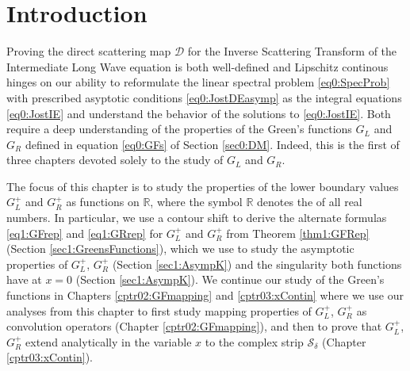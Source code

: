 \documentclass[../dissertation.tex]{subfiles}
\begin{document}
\setcounter{section}{-1}
\section{Introduction}\label{sec1:Intro}

Proving the direct scattering map $\mathscr D$ for the Inverse Scattering Transform
of the Intermediate Long Wave equation is both well-defined and Lipschitz 
continous hinges on our ability to reformulate the linear spectral problem 
\eqref{eq0:SpecProb} with prescribed asyptotic conditions \eqref{eq0:JostDEasymp}
as the integral equations \eqref{eq0:JostIE} and understand the behavior of 
the solutions to \eqref{eq0:JostIE}. Both require a deep understanding of
the properties of the Green's functions $G_L$ and $G_R$ defined in equation
\eqref{eq0:GFs} of Section \ref{sec0:DM}. Indeed, this is the first of three
chapters devoted solely to the study of $G_L$ and $G_R$.


The focus of this chapter is to study the properties 
of the lower boundary values $G_L^+$ and $G_R^+$ as functions on $\mathbb R$, 
where the symbol $\mathbb R$ denotes the of all real numbers.\label{sym:Reals}
In particular, we use a contour shift to derive the alternate formulas
\eqref{eq1:GFrep} and \eqref{eq1:GRrep} for $G_L^+$ and $G_R^+$ from 
Theorem \ref{thm1:GFRep} (Section \ref{sec1:GreensFunctions}), which
we use to study the asymptotic properties of $G_L^+$, 
$G_R^+$ (Section \ref{sec1:AsympK}) and the singularity both functions have 
at $x=0$ (Section \ref{sec1:AsympK}). We continue our study of the Green's
functions in Chapters \ref{cptr02:GFmapping} and \ref{cptr03:xContin} 
where we use our analyses from this chapter 
to first study mapping properties of $G_L^+$, $G_R^+$ as convolution operators 
(Chapter \ref{cptr02:GFmapping}), and then to prove that $G_L^+$, $G_R^+$
extend analytically in the variable $x$ to the complex strip $\mathcal S_\delta$
(Chapter \ref{cptr03:xContin}).



\end{document}
